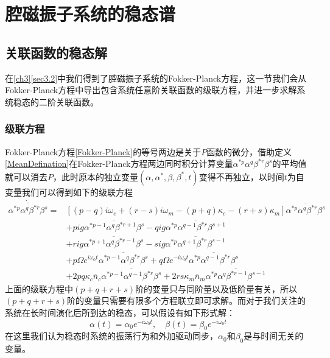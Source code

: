
\chapter{腔磁振子系统的稳态谱}
\label{ch4}

\section{关联函数的稳态解}
在\ref{ch3}\ref{sec3.2}中我们得到了腔磁振子系统的Fokker-Planck方程，这一节我们会从Fokker-Planck方程中导出包含系统任意阶关联函数的级联方程，并进一步求解系统稳态的二阶关联函数。

\subsection{级联方程}
Fokker-Planck方程\eqref{Fokker-Planck}的等号两边是关于$P$函数的微分，借助定义\eqref{MeanDefination}在Fokker-Planck方程两边同时积分计算变量$\alpha^{*p}\alpha^{q}\beta^{*r}\beta^{s}$的平均值就可以消去$P$，此时原本的独立变量$(\alpha,\alpha^{*},\beta,\beta^{*},t)$变得不再独立，以时间$t$为自变量我们可以得到如下的级联方程
\begin{equation}
\begin{aligned}
\dot{\overline{\alpha^{*p}\alpha^q\beta^{*r}\beta^s}}={}&\left[ (p-q)i\omega_{c}+(r-s)i\omega_{m}-(p+q)\kappa_{c}-(r+s)\kappa_{m}\right]\overline{\alpha^{*p}\alpha^q\beta^{*r}\beta^s} \\ &+pig\overline{\alpha^{*p-1}\alpha^q\beta^{*r+1}\beta^s} -qig\overline{\alpha^{*p}\alpha^{q-1}\beta^{*r}\beta^{s+1}} \\ &+rig\overline{\alpha^{*p+1}\alpha^q\beta^{*r-1}\beta^s} -sig\overline{\alpha^{*p}\alpha^{q+1}\beta^{*r}\beta^{s-1}}  \\
&+p\Omega e^{i\omega_{0}t}\overline{\alpha^{*p-1}\alpha^q\beta^{*r}\beta^s} +q\Omega e^{-i\omega_{0}t}\overline{\alpha^{*p}\alpha^{q-1}\beta^{*r}\beta^s} \\
&+2pq\kappa_{c}\overline{n}_{c}\overline{\alpha^{*p-1}\alpha^{q-1}\beta^{*r}\beta^s}
+2rs\kappa_{m}\overline{n}_{m}\overline{\alpha^{*p}\alpha^q\beta^{*r-1}\beta^{s-1}}
\label{HierarchicalEq}
\end{aligned}
\end{equation}
上面的级联方程中$(p+q+r+s)$阶的变量只与同阶量以及低阶量有关，所以$(p+q+r+s)$阶的变量只需要有限多个方程联立即可求解。而对于我们关注的系统在长时间演化后所到达的稳态，可以假设有如下形式解：
\begin{equation}
\alpha(t)=\alpha_{0}e^{-i\omega_{0}t}, \quad \beta(t)=\beta_{0}e^{-i\omega_{0}t}
\label{SolutionForm}
\end{equation}
在这里我们认为稳态时系统的振荡行为和外加驱动同步，$\alpha_{0}$和$\beta_{0}$是与时间无关的变量。

